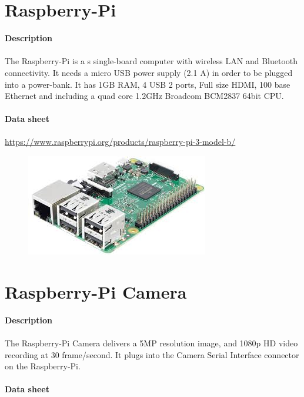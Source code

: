 \documentclass[12pt]{report}
\begin{document}
	\section{Raspberry-Pi}
	\textbf{Description}
	\paragraph{}
	The Raspberry-Pi is a s single-board computer with wireless LAN and Bluetooth connectivity. It needs a micro USB power supply (2.1 A) in order to be plugged into a power-bank. It has 1GB RAM, 4 USB 2 ports, Full size HDMI, 100 base Ethernet and including a quad core 1.2GHz Broadcom BCM2837 64bit CPU.\\ \\
	\textbf{Data sheet} 
	\paragraph{}
	\url{https://www.raspberrypi.org/products/raspberry-pi-3-model-b/}
	\begin{figure}[H]
		\begin{center}
			\includegraphics[scale=0.6]{res/raspberry.jpg}
		\end{center}
	\end{figure}
	\section{Raspberry-Pi Camera}
	\textbf{Description}
	\paragraph{}
	The Raspberry-Pi Camera delivers a 5MP resolution image, and 1080p HD video recording at 30 frame/second. It plugs into the Camera Serial Interface connector on the Raspberry-Pi. \\ \\
	\textbf{Data sheet} 
\end{document}
